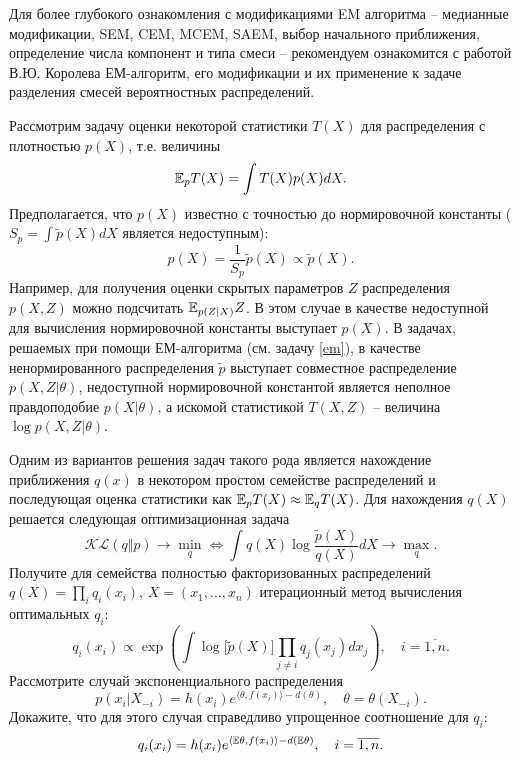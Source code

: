 \begin{remark}

Для более глубокого ознакомления с модификациями EM алгоритма -- медианные модификации, SEM, CEM, MCEM, SAEM, выбор начального приближения, определение числа компонент и типа смеси -- рекомендуем ознакомится с работой  В.Ю. Королева ЕМ-алгоритм, его модификации и их применение к задаче разделения смесей вероятностных распределений.  

\end{remark}


\begin{problem}
\label{varinf}

Рассмотрим  задачу оценки некоторой статистики $T(X)$ для распределения с плотностью $p(X)$, т.е. величины 
\[
\mathrm{{\mathbb E}}_p T(X) = \int  T(X)p(X)dX.
\] 
Предполагается, что  $p(X)$  известно с точностью до нормировочной константы ($S_p =  \int \tilde{p}(X)dX$ является недоступным):
\[
p ( X ) = \frac{1}{S_p} \tilde{p}( X ) \propto \tilde{p}( X ). 
\]
Например, для получения оценки скрытых параметров $Z$ распределения $p(X,Z)$ можно подсчитать  $\mathrm{{\mathbb E}}_{p(Z|X)} Z$. В этом случае в качестве недоступной для вычисления нормировочной константы выступает $p(X)$. В задачах, решаемых при помощи ЕМ-алгоритма (см. задачу \ref{em}), в качестве ненормированного распределения $\tilde{p}$ выступает совместное распределение $p(X, Z |\theta)$, недоступной нормировочной константой является неполное правдоподобие $p(X |\theta)$, а искомой статистикой $T(X,Z)$ -- величина $\log p(X, Z | \theta)$.

Одним из вариантов решения задач такого рода является нахождение приближения $q(x)$ в некотором простом семействе распределений и последующая оценка статистики как $\mathrm{{\mathbb E}}_p T(X) \approx \mathrm{{\mathbb E}}_q T(X)$. Для нахождения $q(X)$ решается следующая оптимизационная задача  
\[
\mathcal{KL}(q \Vert p) \to \min_q
\Leftrightarrow
\int q(X) \log \frac{\tilde{p}(X)}{q(X)}dX \to \max_q.
\]
Получите для семейства полностью факторизованных распределений $q(X) = \prod_i q_i(x_i)$, $X = (x_1,\ldots,x_n)$ итерационный метод вычисления оптимальных $q_i$: 
\[
q_i(x_i) \propto \exp \left(\int \log \big[ \tilde{p}(X) \big] \prod_{j \neq i} q_j(x_j) dx_j \right), 
\quad i = \overline{1,n}.
\]
Рассмотрите случай экспоненциального распределения 
\[
p(x_i |X_{-i})=h(x_i) e^{ \langle \theta, f(x_i) \rangle - d(\theta) },\quad
\theta = \theta(X_{-i}).
\]
Докажите, что для этого случая справедливо упрощенное  соотношение для  $q_i$:
\[
q_i(x_i) = h(x_i) e^{ \langle \mathrm{{\mathbb E}}\theta , f(x_i) \rangle - d(\mathrm{{\mathbb E}}\theta) } , 
\quad i = \overline{1,n}.
\] 

\end{problem}

